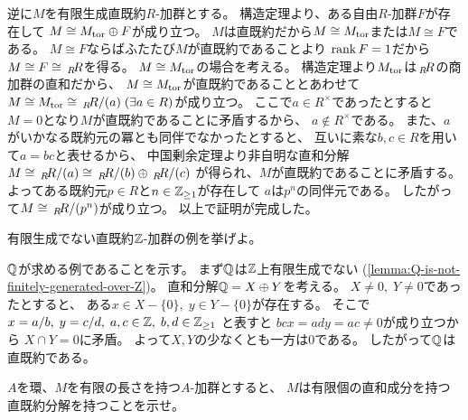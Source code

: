 \documentclass[report]{jlreq}
\begin{document}
\begin{answer}
    逆に$M$を有限生成直既約$R$-加群とする。
    構造定理より、ある自由$R$-加群$F$が存在して
    $M \cong M_{\mathrm{tor}} \oplus F$が成り立つ。
    $M$は直既約だから$M \cong M_{\mathrm{tor}}$または$M \cong F$である。
    $M \cong F$ならばふたたび$M$が直既約であることより
    $\operatorname{rank} F = 1$だから$M \cong F \cong \,{}_{R}\!R$を得る。
    $M \cong M_{\mathrm{tor}}$の場合を考える。
    構造定理より$M_{\mathrm{tor}}$は$\,{}_{R}\!R$の商加群の直和だから、
    $M \cong M_{\mathrm{tor}}$が直既約であることとあわせて
    $M \cong M_{\mathrm{tor}} \cong \,{}_{R}\!R / (a) \; (\exists a \in R)$が成り立つ。
    ここで$a \in R^\times$であったとすると
    $M = 0$となり$M$が直既約であることに矛盾するから、
    $a \notin R^\times$である。
    また、$a$がいかなる既約元の冪とも同伴でなかったとすると、
    互いに素な$b, c \in R$を用いて$a = bc$と表せるから、
    中国剰余定理より非自明な直和分解
    $M \cong \,{}_{R}\!R / (a) \cong \,{}_{R}\!R / (b) \oplus \,{}_{R}\!R / (c)$
    が得られ、$M$が直既約であることに矛盾する。
    よってある既約元$p \in R$と$n \in \mathbb{Z}_{\ge 1}$が存在して
    $a$は$p^n$の同伴元である。
    したがって$M \cong \,{}_{R}\!R / (p^n)$が成り立つ。
    以上で証明が完成した。
\end{answer}

\begin{problem}[代数学II 10.126]
    有限生成でない直既約$\mathbb{Z}$-加群の例を挙げよ。
\end{problem}

\begin{answer}
    $\mathbb{Q}$が求める例であることを示す。
    まず$\mathbb{Q}$は$\mathbb{Z}$上有限生成でない (\cref{lemma:Q-is-not-finitely-generated-over-Z})。
    直和分解$\mathbb{Q} = X \oplus Y$を考える。
    $X \neq 0, \; Y \neq 0$であったとすると、
    ある$x \in X - \{ 0 \}, \; y \in Y - \{ 0 \}$が存在する。
    そこで$x = a / b, \;
        y = c / d, \;
        a, c \in \mathbb{Z}, \;
        b, d \in \mathbb{Z}_{\ge 1}$
    と表すと
    $bcx = ady = ac \neq 0$が成り立つから
    $X \cap Y = 0$に矛盾。
    よって$X, Y$の少なくとも一方は$0$である。
    したがって$\mathbb{Q}$は直既約である。
\end{answer}

\begin{problem}[代数学II 10.128]
    $A$を環、$M$を有限の長さを持つ$A$-加群とすると、
    $M$は有限個の直和成分を持つ直既約分解を持つことを示せ。
\end{problem}
\end{document}
